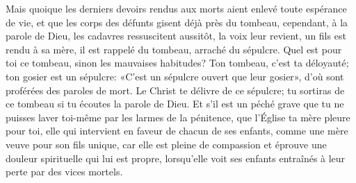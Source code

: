 Mais quoique les derniers devoirs rendus aux morts
		aient enlevé toute espérance de vie,
	et que les corps des défunts gisent déjà près du tombeau,
	cependant, à la parole de Dieu, les cadavres ressuscitent aussitôt,
	la voix leur revient, un fils est rendu à sa mère,
	il est rappelé du tombeau, arraché du sépulcre.
Quel est pour toi ce tombeau, sinon les mauvaises habitudes?
Ton tombeau, c’est ta déloyauté;
	ton gosier est un sépulcre: «C’est un sépulcre ouvert que leur gosier»,
	d’où sont proférées des paroles de mort.
Le Christ te délivre de ce sépulcre;
	tu sortiras de ce tombeau si tu écoutes la parole de Dieu.
Et s’il est un péché grave
		que tu ne puisses laver toi-même par les larmes de la pénitence,
	que l’Église ta mère pleure pour toi,
	elle qui intervient en faveur de chacun de ses enfants,
	comme une mère veuve pour son fils unique,
	car elle est pleine de compassion
		et éprouve une douleur spirituelle qui lui est propre,
	lorsqu’elle voit ses enfants entraînés à leur perte par des vices mortels.
